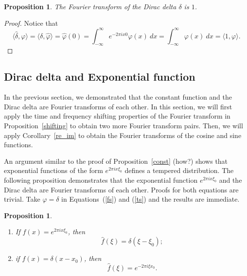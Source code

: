 \documentclass[12pt, letterpaper]{article}
\theoremstyle{plain}
\newtheorem{proposition}[theorem]{Proposition}
\renewcommand{\phi}{\varphi}
\begin{document}
\begin{proposition}
    The Fourier transform of the Dirac delta $\delta$ is $1$.
\end{proposition}

\begin{proof}
    Notice that
    \begin{equation}
        \langle \hat{\delta}, \phi \rangle = \langle \delta, \hat{\phi} \rangle = \hat{\phi}(0) = \int_{-\infty}^\infty e^{-2\pi ix0} \phi(x) \ dx = \int_{-\infty}^\infty \phi(x) \ dx = \langle 1, \phi \rangle.
    \end{equation}
\end{proof}

\subsection{Dirac delta and Exponential function}\label{sec34}

In the previous section, we demonstrated that the constant function and the Dirac delta are Fourier transforms of each other. In this section, we will first apply the time and frequency shifting properties of the Fourier transform in Proposition~\ref{shifting} to obtain two more Fourier transform pairs. Then, we will apply Corollary~\ref{re_im} to obtain the Fourier transforms of the cosine and sine functions.

An argument similar to the proof of Proposition~\ref{const} (how?) shows that exponential functions of the form $e^{2\pi i x \xi_0}$ defines a tempered distribution. The following proposition demonstrates that the exponential function $e^{2\pi i x \xi_0}$ and the Dirac delta are Fourier transforms of each other. Proofs for both equations are trivial. Take $\phi = \delta$ in Equations~(\ref{fs}) and (\ref{ts}) and the results are immediate.

\begin{proposition}
    \quad
    \begin{enumerate}
        \item If $f(x) = e^{2\pi i x \xi_0}$, then
        \begin{equation}
            \hat{f}(\xi) = \delta(\xi - \xi_0);
        \end{equation}
        \item if $f(x) = \delta(x - x_0)$, then
        \begin{equation}
            \hat{f}(\xi) = e^{-2\pi i\xi x_0}.
        \end{equation}
    \end{enumerate}
\end{proposition}
\end{document}
